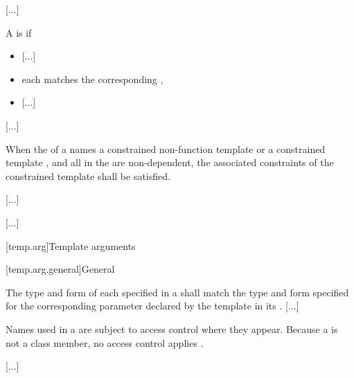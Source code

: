 \documentclass{wg21}
\begin{document}

\textcolor{noteclr}{[...]}

\pnum
A  is  if
\begin{itemize}
\item
  \textcolor{noteclr}{[...]}

\item
  each  matches the corresponding
  ,

\item
  \textcolor{noteclr}{[...]}
\end{itemize}
\textcolor{noteclr}{[...]}

\pnum
When the 
of a 
names a constrained non-function template
or
a constrained template ,
and
all 
in the 
are non-dependent,
the associated constraints
of the constrained template
shall be satisfied.
\begin{example} \textcolor{noteclr}{[...]} \end{example}

\textcolor{noteclr}{[...]}


[temp.arg]{Template arguments}

[temp.arg.general]{General}


\pnum
{}
The type and form of each
specified in a
shall match the type and form specified for the corresponding
parameter declared by the template in its
.
\textcolor{noteclr}{[...]}

\pnum
\begin{note}
Names used in a 
are subject to access control where they appear.
Because a  is not a class member,
no access control applies .
\end{note}
\textcolor{noteclr}{[...]}
\end{document}
